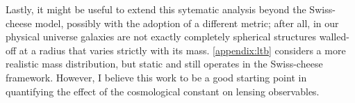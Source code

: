 Lastly, it might be useful to extend this sytematic analysis beyond the Swiss-cheese model, possibly with the adoption of a different metric; after all, in our physical universe galaxies are not exactly completely spherical structures walled-off at a radius that varies strictly with its mass. \autoref{appendix:ltb} considers a more realistic mass distribution, but static and still operates in the Swiss-cheese framework. However, I believe this work to be a good starting point in quantifying the effect of the cosmological constant on lensing observables. 

